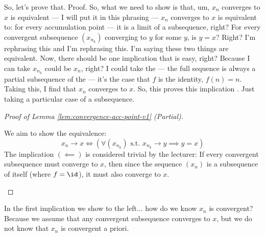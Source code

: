 \begin{spoken-clean}[00:05:04 - 00:06:50]
So, let's prove that. Proof.  So, what we need to show is that, um, $x_n$ converges to $x$ is equivalent — I will put it in this phrasing — $x_n$ converges to $x$ is equivalent to: for every accumulation point — it is a limit of a subsequence, right? For every convergent subsequence $(x_{n_k})$ converging to $y$ for some $y$, is $y = x$? Right? I'm rephrasing this and I'm rephrasing this. I'm saying these two things are equivalent. Now, there should be one implication that is easy, right? Because I can take $x_{n_k}$ could be $x_n$, right? I could take the — the full sequence is always a partial subsequence of the — it's the case that $f$ is the identity, $f(n) = n$. Taking this, I find that $x_n$ converges to $x$. So, this proves this implication . Just taking a particular case of a subsequence.
\end{spoken-clean}


\begin{proof}[Proof of Lemma \ref{lem:convergence-acc-point-v1} (Partial)]
\begin{math-stroke}
We aim to show the equivalence:
\[ x_n \to x \iff \left( \forall (x_{n_k}) \text{ s.t. } x_{n_k} \to y \implies y = x \right) \]
The implication $(\impliedby)$ is considered trivial by the lecturer:
If every convergent subsequence must converge to $x$, then since the sequence $(x_n)$ is a subsequence of itself (where $f = \id$), it must also converge to $x$.
\end{math-stroke}
\end{proof}

\begin{student-interaction}
In the first implication we show to the left... how do we know $x_n$ is convergent? Because we assume that any convergent subsequence converges to $x$, but we do not know that $x_n$ is convergent a priori.
\end{student-interaction}

